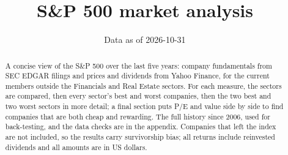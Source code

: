 \documentclass[11pt,a4paper]{article}
\title{S\&P 500 market analysis}
\author{Data as of 2026-10-31}
\date{}
\begin{document}
\maketitle
\begin{abstract}
A concise view of the S\&P 500 over the last five years: company fundamentals from SEC EDGAR filings and prices and dividends from Yahoo Finance, for the current members outside the Financials and Real Estate sectors. For each measure, the sectors are compared, then every sector's best and worst companies, then the two best and two worst sectors in more detail; a final section puts P/E and value side by side to find companies that are both cheap and rewarding. The full history since 2006, used for back-testing, and the data checks are in the appendix. Companies that left the index are not included, so the results carry survivorship bias; all returns include reinvested dividends and all amounts are in US dollars.
\end{abstract}
\tableofcontents
\newpage
\end{document}
